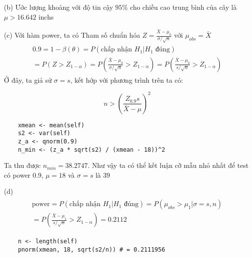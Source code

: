 (b) Ước lượng khoảng với độ tin cậy $95\%$ cho chiều cao trung bình của cây là $\mu > 16.642$ inchs

(c) Với hàm power, ta có 
Tham số chuẩn hóa $Z = \frac{\bar{X} - \mu_0}{\sigma / \sqrt{n}}$ với $\mu_{obs} = \bar{X}$
\begin{align*}
    \begin{split}
        0.9 = 1 - \beta(\theta) = P(\text{chấp nhận } H_1 | H_1 \text{ đúng}) \\
        = P(Z > Z_{1 - \alpha}) = P\left(\frac{\bar{X} - \mu_0}{\sigma / \sqrt{n}} > Z_{1 - \alpha}\right)
        = P\left(\frac{\bar{X} - \mu_0}{s / \sqrt{n}} > Z_{1 - \alpha}\right)
    \end{split}
\end{align*}
Ở đây, ta giả sử $\sigma = s$, kết hớp với phương trình trên ta có:

$$n > \left(\frac{Z_{0.9}s}{\bar{X} - \mu}\right)^2$$

\begin{lstlisting}
    xmean <- mean(self)
    s2 <- var(self)
    z_a <- qnorm(0.9)
    n_min <- (z_a * sqrt(s2) / (xmean - 18))^2
\end{lstlisting}

Ta thu được $n_{min} = 38.2747$. Như vậy ta có thể kết luận cỡ mẫu nhỏ nhất để test có power $0.9$, $\mu = 18$ và $\sigma = s$ là $39$

(d) 
\begin{align*}
    \begin{split}
        \text{power} = P(\text{chấp nhận } H_1 | H_1 \text{ đúng}) = P\left(\mu_{obs} > \mu_1 | \sigma = s, n\right) \\
        = P\left(\frac{\bar{X} - \mu_1}{s/ \sqrt{n}} > Z_{1 - \alpha}\right) = 0.2112      
    \end{split}
\end{align*}

\begin{lstlisting}
    n <- length(self)
    pnorm(xmean, 18, sqrt(s2/n)) # = 0.2111956
\end{lstlisting}


